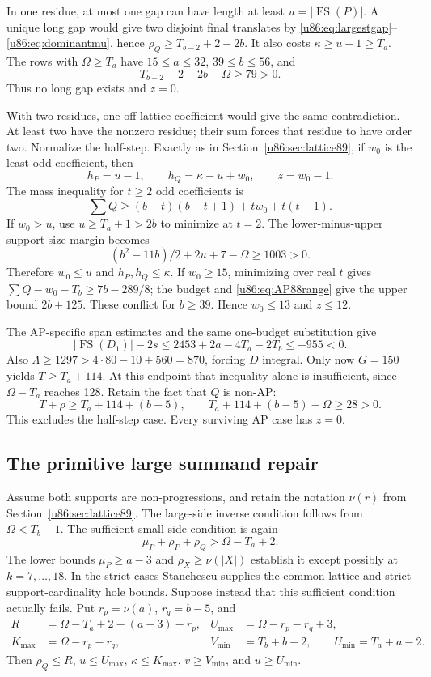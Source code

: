 \documentclass[11pt,a4paper]{article}
\theoremstyle{remark}
\newcommand{\FS}{\operatorname{FS}}
\begin{document}
In one residue, at most one gap can have length at least $u=|\FS(P)|$.
A unique long gap would give two disjoint final translates by
\eqref{u86:eq:largestgap}--\eqref{u86:eq:dominantmu}, hence
$\rho_Q\ge T_{b-2}+2-2b$. It also costs $\kappa\ge u-1\ge T_a$.
The rows with $\Omega\ge T_a$ have $15\le a\le32$, $39\le b\le56$,
and
\[
 T_{b-2}+2-2b-\Omega\ge79>0.
\]
Thus no long gap exists and $z=0$.

With two residues, one off-lattice coefficient would give the same
contradiction. At least two have the nonzero residue; their sum forces
that residue to have order two. Normalize the half-step. Exactly as in
Section~\ref{u86:sec:lattice89}, if $w_0$ is the least odd coefficient, then
\[
 h_P=u-1,\qquad h_Q=\kappa-u+w_0,\qquad z=w_0-1.
\]
The mass inequality for $t\ge2$ odd coefficients is
\[
 \sum Q\ge(b-t)(b-t+1)+tw_0+t(t-1).
\]
If $w_0>u$, use $u\ge T_a+1>2b$ to minimize at $t=2$.
The lower-minus-upper support-size margin becomes
\[
 (b^2-11b)/2+2u+7-\Omega\ge1003>0.
\]
Therefore $w_0\le u$ and $h_P,h_Q\le\kappa$.
If $w_0\ge15$, minimizing over real $t$ gives
$\sum Q-w_0-T_b\ge7b-289/8$; the budget and
\eqref{u86:eq:AP88range} give the upper bound $2b+125$.
These conflict for $b\ge39$. Hence $w_0\le13$ and $z\le12$.

The AP-specific span estimates and the same one-budget substitution give
\[
 |\FS(D_1)|-2s\le2453+2a-4T_a-2T_b\le-955<0.
\]
Also $\Lambda\ge1297>4\cdot80-10+560=870$, forcing $D$ integral.
Only now $G=150$ yields $T\ge T_a+114$.
At this endpoint that inequality alone is insufficient, since
$\Omega-T_a$ reaches 128. Retain the fact that $Q$ is non-AP:
\[
 T+\rho\ge T_a+114+(b-5),\qquad
 T_a+114+(b-5)-\Omega\ge28>0.
\]
This excludes the half-step case. Every surviving AP case has $z=0$.

\subsection{The primitive large summand repair}
Assume both supports are non-progressions, and retain the notation
$\nu(r)$ from Section~\ref{u86:sec:lattice89}. The large-side inverse
condition follows from $\Omega<T_b-1$. The sufficient small-side
condition is again
\[
 \mu_P+\rho_P+\rho_Q>\Omega-T_a+2.
\]
The lower bounds $\mu_P\ge a-3$ and $\rho_X\ge\nu(|X|)$ establish it
except possibly at $k=7,\ldots,18$. In the strict cases Stanchescu
supplies the common lattice and strict support-cardinality hole bounds.
Suppose instead that this sufficient condition actually fails. Put
$r_p=\nu(a)$, $r_q=b-5$, and
\begin{align*}
 R&=\Omega-T_a+2-(a-3)-r_p,&
 U_{\max}&=\Omega-r_p-r_q+3,\\
 K_{\max}&=\Omega-r_p-r_q,&
 V_{\min}&=T_b+b-2,\qquad U_{\min}=T_a+a-2.
\end{align*}
Then $\rho_Q\le R$, $u\le U_{\max}$, $\kappa\le K_{\max}$,
$v\ge V_{\min}$, and $u\ge U_{\min}$.
\end{document}
